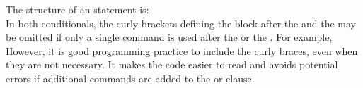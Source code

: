 The structure of an  statement is:\\
In both conditionals, the curly brackets defining the block after the  and the  may be omitted if only a single command is used after the   or the .  For example,\\
However, it is good programming practice to include the curly braces, even when they are not  necessary.  It makes the code easier to read and avoids potential errors if additional commands are added to the  or  clause.


